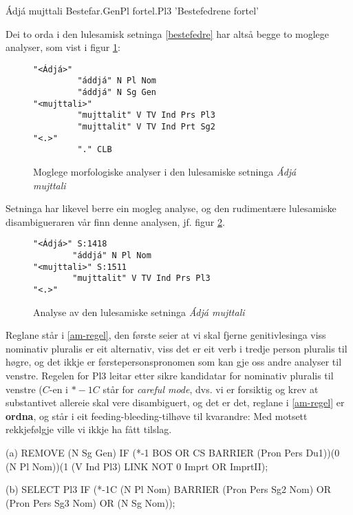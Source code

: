 \documentclass[a4paper,nynorsk]{article}
\begin{document}
\begin{example}\label{bestefedre}
\gll Ádjá mujttali
    Bestefar.GenPl fortel.Pl3
\glt 'Bestefedrene fortel'    
\glend
\end{example}%

Dei to orda i den lulesamisk setninga \ref{bestefedre} har altså begge to moglege analyser, som vist i figur \ref{am-multi}:

\begin{figure}[htbp]
\begin{center}
\begin{verbatim}
"<Ádjá>"
         "áddjá" N Pl Nom
         "áddjá" N Sg Gen
"<mujttali>"
         "mujttalit" V TV Ind Prs Pl3
         "mujttalit" V TV Ind Prt Sg2
"<.>"
         "." CLB
\end{verbatim}
\caption{Moglege morfologiske analyser i den lulesamiske setninga \textit{Ádjá mujttali}}
\label{am-multi}
\end{center}
\end{figure}

Setninga har likevel berre ein mogleg analyse, og den rudimentære lulesamiske disambigueraren vår finn denne analysen, jf. figur \ref{am}. %

\begin{figure}[htbp]
\begin{center}
\begin{verbatim}
"<Ádjá>" S:1418
        "áddjá" N Pl Nom
"<mujttali>" S:1511
        "mujttalit" V TV Ind Prs Pl3
"<.>"
\end{verbatim}
\caption{Analyse av den lulesamiske setninga \textit{Ádjá mujttali}}
\label{am}
\end{center}
\end{figure}

Reglane står i \ref{am-regel}, den første seier at vi skal fjerne genitivlesinga viss nominativ pluralis er eit alternativ, viss det er eit verb i tredje person pluralis til høgre, og det ikkje er førstepersonspronomen som kan gje  oss andre analyser til venstre. Regelen for Pl3 leitar etter sikre kandidatar for nominativ pluralis til venstre ($C$-en i $*-1C$ står for \textit{careful mode}, dvs. vi er forsiktig og krev at substantivet allereie skal vere disambiguert, og det er det, reglane i \ref{am-regel} er \textbf{ordna}, og står i eit feeding-bleeding-tilhøve til kvarandre: Med motsett rekkjefølgje ville vi ikkje ha fått tilslag. %

\begin{example}\label{am-regel}
\item[(a)] REMOVE (N Sg Gen) IF (*-1 BOS OR CS BARRIER (Pron Pers Du1))(0 (N Pl Nom))(1 (V Ind Pl3) LINK NOT 0 Imprt OR ImprtII);
\item[(b)] SELECT Pl3 IF (*-1C (N Pl Nom) BARRIER (Pron Pers Sg2 Nom) OR  (Pron Pers Sg3 Nom) OR (N Sg Nom));
\end{example}
\end{document}
